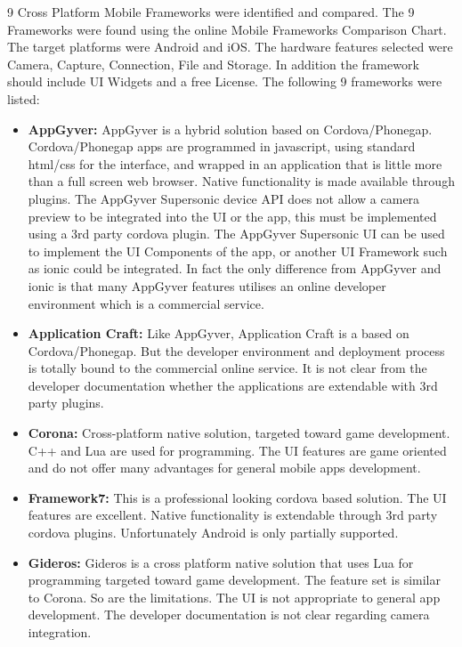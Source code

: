 9 Cross Platform Mobile Frameworks were identified and compared. The 9 Frameworks were  found using the online Mobile Frameworks Comparison Chart. The target platforms were Android and iOS. The hardware features selected were Camera, Capture, Connection, File and Storage. In addition the framework should include UI Widgets and a free License. The following 9 frameworks were listed:

\begin{itemize}[label={}]
\item \textbf{AppGyver:} AppGyver is a hybrid solution based on Cordova/Phonegap. Cordova/Phonegap apps are programmed in javascript, using standard html/css for the interface, and wrapped in an application that is little more than a full screen web browser. Native functionality is made available through plugins. The AppGyver Supersonic device API does not allow a camera preview to be integrated into the UI or the app, this must be implemented using a 3rd party cordova plugin. The AppGyver Supersonic UI can be used to implement the UI Components of the app, or another UI Framework such as ionic could be integrated. In fact the only difference from AppGyver and ionic is that many AppGyver features utilises an online developer environment which is a commercial service.

\item \textbf{Application Craft:} Like AppGyver, Application Craft is a based on Cordova/Phonegap. But the developer environment and deployment process is totally bound to the commercial online service. It is not clear from the developer documentation whether the applications are extendable with 3rd party plugins.

\item \textbf{Corona:} Cross-platform native solution, targeted toward game development. C++ and Lua are used for programming. The UI features are game oriented and do not offer many advantages for general mobile apps development.

\item \textbf{Framework7:} This is a professional looking cordova based solution. The UI features are excellent. Native functionality is extendable through 3rd party cordova plugins. Unfortunately Android is only partially supported.

\item \textbf{Gideros:} Gideros is a cross platform native solution that uses Lua for programming targeted toward game development. The feature set is similar to Corona. So are the limitations. The UI is not appropriate to general app development. The developer documentation is not clear regarding camera integration.


\end{itemize}
